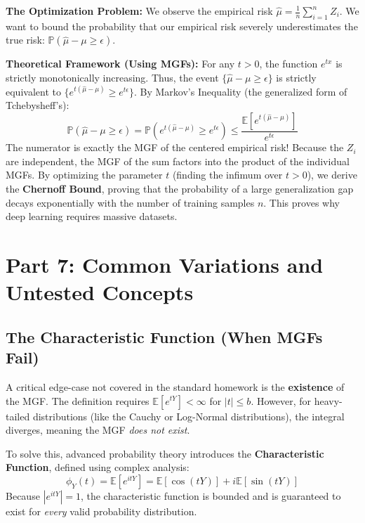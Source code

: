 \documentclass[11pt, a4paper]{article}
\theoremstyle{definition}
\theoremstyle{remark}
\newcommand{\E}{\mathbb{E}}
\newcommand{\Prob}{\mathbb{P}}
\begin{document}
\textbf{The Optimization Problem:} We observe the empirical risk $\hat{\mu} = \frac{1}{n} \sum_{i=1}^n Z_i$. We want to bound the probability that our empirical risk severely underestimates the true risk: $\Prob(\hat{\mu} - \mu \ge \epsilon)$.

\textbf{Theoretical Framework (Using MGFs):}
For any $t > 0$, the function $e^{tx}$ is strictly monotonically increasing. Thus, the event $\{\hat{\mu} - \mu \ge \epsilon\}$ is strictly equivalent to $\{e^{t(\hat{\mu} - \mu)} \ge e^{t\epsilon}\}$.
By Markov's Inequality (the generalized form of Tchebysheff's):
\[ \Prob(\hat{\mu} - \mu \ge \epsilon) = \Prob(e^{t(\hat{\mu} - \mu)} \ge e^{t\epsilon}) \le \frac{\E[e^{t(\hat{\mu} - \mu)}]}{e^{t\epsilon}} \]
The numerator is exactly the MGF of the centered empirical risk! Because the $Z_i$ are independent, the MGF of the sum factors into the product of the individual MGFs. By optimizing the parameter $t$ (finding the infimum over $t > 0$), we derive the \textbf{Chernoff Bound}, proving that the probability of a large generalization gap decays exponentially with the number of training samples $n$. This proves why deep learning requires massive datasets.

\newpage
\section{Part 7: Common Variations and Untested Concepts}

\subsection{The Characteristic Function (When MGFs Fail)}
A critical edge-case not covered in the standard homework is the \textbf{existence} of the MGF. The definition requires $\E[e^{tY}] < \infty$ for $|t| \le b$. However, for heavy-tailed distributions (like the Cauchy or Log-Normal distributions), the integral diverges, meaning the MGF \textit{does not exist}. 

To solve this, advanced probability theory introduces the \textbf{Characteristic Function}, defined using complex analysis:
\[ \phi_Y(t) = \E[e^{itY}] = \E[\cos(tY)] + i\E[\sin(tY)] \]
Because $|e^{itY}| = 1$, the characteristic function is bounded and is guaranteed to exist for \textit{every} valid probability distribution.
\end{document}
